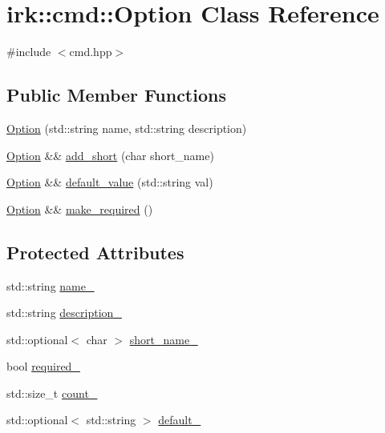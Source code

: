\hypertarget{classirk_1_1cmd_1_1Option}{}\section{irk\+:\+:cmd\+:\+:Option Class Reference}
\label{classirk_1_1cmd_1_1Option}


{\ttfamily \#include $<$cmd.\+hpp$>$}

\subsection*{Public Member Functions}
\begin{DoxyCompactItemize}
\item 
\mbox{\hyperlink{classirk_1_1cmd_1_1Option_ad958f3683346fd37a72ac83431943657}{Option}} (std\+::string name, std\+::string description)
\item 
\mbox{\hyperlink{classirk_1_1cmd_1_1Option}{Option}} \&\& \mbox{\hyperlink{classirk_1_1cmd_1_1Option_aacea430a107430663a0aa6c51f8c986d}{add\+\_\+short}} (char short\+\_\+name)
\item 
\mbox{\hyperlink{classirk_1_1cmd_1_1Option}{Option}} \&\& \mbox{\hyperlink{classirk_1_1cmd_1_1Option_a8e77bc163d119d47ced234959e2d59db}{default\+\_\+value}} (std\+::string val)
\item 
\mbox{\hyperlink{classirk_1_1cmd_1_1Option}{Option}} \&\& \mbox{\hyperlink{classirk_1_1cmd_1_1Option_ad88478718ae315efd0777c0ba10637c3}{make\+\_\+required}} ()
\end{DoxyCompactItemize}
\subsection*{Protected Attributes}
\begin{DoxyCompactItemize}
\item 
std\+::string \mbox{\hyperlink{classirk_1_1cmd_1_1Option_a2518068ce8131eee38eb89cc1b355bed}{name\+\_\+}}
\item 
std\+::string \mbox{\hyperlink{classirk_1_1cmd_1_1Option_a6ce1b837b2e4152c1d82280d5396ebc2}{description\+\_\+}}
\item 
std\+::optional$<$ char $>$ \mbox{\hyperlink{classirk_1_1cmd_1_1Option_a734f207dc2ed628ebf4a996c56b5d1c6}{short\+\_\+name\+\_\+}}
\item 
bool \mbox{\hyperlink{classirk_1_1cmd_1_1Option_a520123e8999e2e3ba33e3faf769d5617}{required\+\_\+}}
\item 
std\+::size\+\_\+t \mbox{\hyperlink{classirk_1_1cmd_1_1Option_a45ea47894fb36f2041b931bf01475961}{count\+\_\+}}
\item 
std\+::optional$<$ std\+::string $>$ \mbox{\hyperlink{classirk_1_1cmd_1_1Option_ace692166a9661b94a3cc422d576ba741}{default\+\_\+}}
\end{DoxyCompactItemize}
